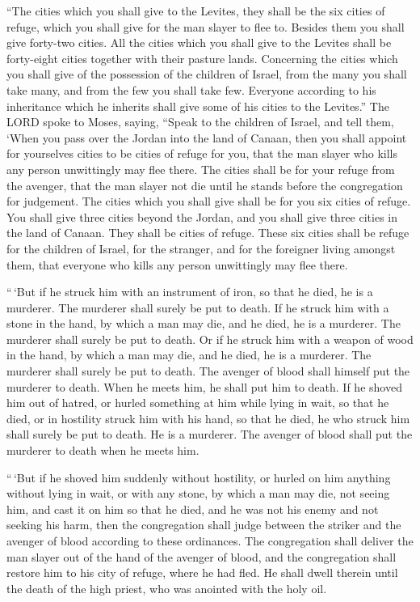  ``The cities which you shall give to the Levites, they
shall be the six cities of refuge, which you shall give for the man
slayer to flee to. Besides them you shall give forty-two cities.
 All the cities which you shall give to the Levites shall be
forty-eight cities together with their pasture lands. 
Concerning the cities which you shall give of the possession of the
children of Israel, from the many you shall take many, and from the few
you shall take few. Everyone according to his inheritance which he
inherits shall give some of his cities to the Levites.'' 
The LORD spoke to Moses, saying,  ``Speak to the children
of Israel, and tell them, `When you pass over the Jordan into the land
of Canaan,  then you shall appoint for yourselves cities to
be cities of refuge for you, that the man slayer who kills any person
unwittingly may flee there.  The cities shall be for your
refuge from the avenger, that the man slayer not die until he stands
before the congregation for judgement.  The cities which
you shall give shall be for you six cities of refuge.  You
shall give three cities beyond the Jordan, and you shall give three
cities in the land of Canaan. They shall be cities of refuge.
 These six cities shall be refuge for the children of
Israel, for the stranger, and for the foreigner living amongst them,
that everyone who kills any person unwittingly may flee there.

 ``\,`But if he struck him with an instrument of iron, so
that he died, he is a murderer. The murderer shall surely be put to
death.  If he struck him with a stone in the hand, by which
a man may die, and he died, he is a murderer. The murderer shall surely
be put to death.  Or if he struck him with a weapon of wood
in the hand, by which a man may die, and he died, he is a murderer. The
murderer shall surely be put to death.  The avenger of
blood shall himself put the murderer to death. When he meets him, he
shall put him to death.  If he shoved him out of hatred, or
hurled something at him while lying in wait, so that he died,
 or in hostility struck him with his hand, so that he died,
he who struck him shall surely be put to death. He is a murderer. The
avenger of blood shall put the murderer to death when he meets him.

 ``\,`But if he shoved him suddenly without hostility, or
hurled on him anything without lying in wait,  or with any
stone, by which a man may die, not seeing him, and cast it on him so
that he died, and he was not his enemy and not seeking his harm,
 then the congregation shall judge between the striker and
the avenger of blood according to these ordinances.  The
congregation shall deliver the man slayer out of the hand of the avenger
of blood, and the congregation shall restore him to his city of refuge,
where he had fled. He shall dwell therein until the death of the high
priest, who was anointed with the holy oil.

